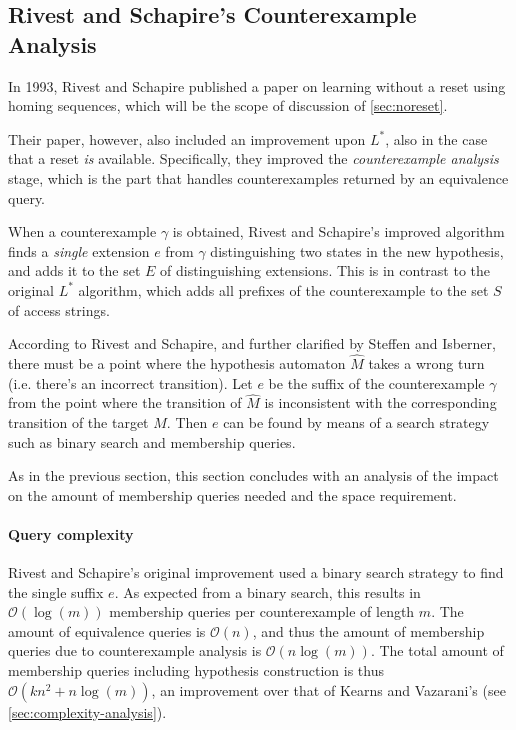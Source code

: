 \documentclass[multi,crop=false,class=article]{standalone}
\begin{document}
\subsection{Rivest and Schapire's Counterexample Analysis}
\label{sec:rivest-schap-count}
In 1993, Rivest and Schapire published a paper on learning without a reset using
homing sequences\cite{Rivest1993}, which will be the scope of discussion of
\cref{sec:noreset}.

Their paper, however, also included an improvement upon $L^*$, also in the case
that a reset \textit{is} available. Specifically, they improved the
\textit{counterexample analysis} stage, which is the part that handles
counterexamples returned by an equivalence query.

When a counterexample $\gamma$ is obtained, Rivest and Schapire's improved
algorithm finds a \textit{single} extension $e$ from $\gamma$ distinguishing two
states in the new hypothesis, and adds it to the set $E$ of distinguishing
extensions. This is in contrast to the original $L^*$ algorithm, which adds all
prefixes of the counterexample to the set $S$ of access strings.

According to Rivest and Schapire\cite{Rivest1993}, and further clarified by
Steffen\cite{Steffen2011} and Isberner\cite{Isberner2014a}, there must be a
point where the hypothesis automaton $\hat M$ takes a wrong turn (i.e. there's
an incorrect transition). Let $e$ be the suffix of the counterexample $\gamma$
from the point where the transition of $\hat M$ is inconsistent with the
corresponding transition of the target $M$. Then $e$ can be found by means of a
search strategy such as binary search and membership queries.

As in the previous section, this section concludes with an analysis of the
impact on the amount of membership queries needed and the space requirement.

\paragraph{Query complexity} Rivest and Schapire's original improvement used a
binary search strategy to find the single suffix $e$. As expected from a binary
search, this results in $\mathcal{O}(\log(m))$ membership queries per
counterexample of length $m$. The amount of equivalence queries is
$\mathcal{O}(n)$, and thus the amount of membership queries due to
counterexample analysis is $\mathcal{O}(n\log(m))$. The total amount of
membership queries including hypothesis construction is thus
$\mathcal{O}(kn^2 + n\log(m))$, an improvement over that of Kearns and
Vazarani's (see \cref{sec:complexity-analysis}).
\end{document}
